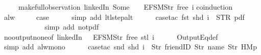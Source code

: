 \begin{isabellebody}
\ \ \ \ \ {\isacharparenleft}make{\isacharunderscore}full{\isacharunderscore}observation\ linkedIn\ {\isacharparenleft}Some\ {}{\isacharparenright}\ {\isacharless}{}\ {\isacharcolon}{\isacharequal}\ EFSM{\isachardot}Str\ {\isacharprime}{\isacharprime}free{\isacharprime}{\isacharprime}{\isachargreater}\ i{\isacharparenright}{\isachardoublequoteclose}\isanewline
%
\isadelimproof
%
\endisadelimproof
%
\isatagproof
{}\isamarkupfalse%
{\isacharparenleft}coinduction{\isacharparenright}\isanewline
\ \ \isamarkupfalse%
\ alw\isanewline
\ \ \isamarkupfalse%
\ \isamarkupfalse%
\ {\isacharquery}case\isanewline
\ \ \ \ \isamarkupfalse%
\ {\isacharparenleft}simp\ add{\isacharcolon}\ ltl{\isacharunderscore}step{\isacharunderscore}alt{\isacharparenright}\isanewline
\ \ \ \ \isamarkupfalse%
\ {\isacharparenleft}case{\isacharunderscore}tac\ {\isachardoublequoteopen}{\isacharparenleft}fst\ {\isacharparenleft}shd\ i{\isacharparenright}{\isacharparenright}\ {\isacharequal}\ STR\ {\isacharprime}{\isacharprime}pdf{\isacharprime}{\isacharprime}{\isachardoublequoteclose}{\isacharparenright}\isanewline
\ \ \ \ \ \isamarkupfalse%
\isanewline
\ \ \ \ \ \isamarkupfalse%
\ {\isacharparenleft}simp\ add{\isacharcolon}\ not{\isacharunderscore}pdf{\isacharunderscore}{}{\isacharparenright}\isanewline
\ \ \ \ \isamarkupfalse%
\ no{\isacharunderscore}output{\isacharunderscore}none{\isacharbrackleft}of\ linkedIn\ {\isachardoublequoteopen}{\isacharless}{}\ {\isacharcolon}{\isacharequal}\ EFSM{\isachardot}Str\ {\isacharprime}{\isacharprime}free{\isacharprime}{\isacharprime}{\isachargreater}{\isachardoublequoteclose}\ {\isachardoublequoteopen}{\isacharparenleft}stl\ i{\isacharparenright}{\isachardoublequoteclose}{\isacharbrackright}\isanewline
\ \ \ \ \isamarkupfalse%
\ OutputEq{\isacharunderscore}def\isanewline
\ \ \ \ \ \isamarkupfalse%
\ {\isacharparenleft}simp\ add{\isacharcolon}\ alw{\isacharunderscore}mono{\isacharparenright}\isanewline
\ \ \ \ \isamarkupfalse%
\ {\isacharparenleft}case{\isacharunderscore}tac\ {\isachardoublequoteopen}{\isacharparenleft}snd\ {\isacharparenleft}shd\ i{\isacharparenright}{\isacharparenright}\ {\isacharequal}\ {\isacharbrackleft}Str\ {\isacharprime}{\isacharprime}friendID{\isacharprime}{\isacharprime}{\isacharcomma}\ Str\ {\isacharprime}{\isacharprime}name{\isacharprime}{\isacharprime}{\isacharcomma}\ Str\ {\isacharprime}{\isacharprime}HM{}p{\isacharprime}{\isacharprime}{\isacharbrackright}{\isachardoublequoteclose}{\isacharparenright}\isanewline

\end{isabellebody}
